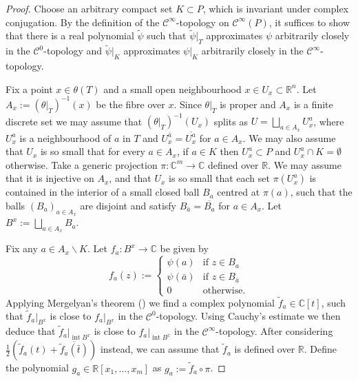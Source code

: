 \documentclass{amsart}
\theoremstyle{plain}
\theoremstyle{definition}
\theoremstyle{remark}
\numberwithin{equation}{thm} %
\newcommand{\R}{\mathbb{R}}
\newcommand{\C}{\mathbb{C}}
\DeclareMathOperator{\Int}{int}
\begin{document}
\begin{proof}
Choose an arbitrary compact set $K\subset P$, which is invariant under complex conjugation. By the definition of the $\mathcal C^\infty$-topology on $\mathcal C^\infty(P)$, it suffices to show that there is a real polynomial $\tilde \psi$ such that $\tilde \psi\vert_T$ approximates $\psi$ arbitrarily closely in the $\mathcal C^0$-topology and $\tilde \psi\vert_K$ approximates $\psi\vert_K$ arbitrarily closely in the $\mathcal C^\infty$-topology.

Fix a point $x\in \theta(T)$ and a small open neighbourhood $x\in U_x\subset \R^n$. Let $A_x:=(\theta\vert_T)^{-1}(x)$ be the fibre over $x$. Since $\theta\vert_T$ is proper and $A_x$ is a finite discrete set we may assume that $(\theta\vert_T)^{-1}(U_x)$ splits as $U=\bigsqcup_{a\in A_x} U_x^a$, where $U_x^a$ is a neighbourhood of $a$ in $T$ and $U_x^{\bar a}=\overline{U_x^a}$ for $a \in A_x$. We may also assume that $U_x$ is so small that for every $a\in A_x$, if $a\in K$ then $U_x^a\subset P$ and $U_x^a\cap K=\emptyset$ otherwise. Take a generic projection $\pi:\C^m\rightarrow \C$ defined over $\R$. We may assume that it is injective on $A_x$, and that $U_x$ is so small that each set $\pi(U_x^a)$ is contained in the interior of a small closed ball $B_a$ centred at $\pi(a)$, such that the balls $(B_a)_{a\in A_x}$ are disjoint and satisfy $B_{\bar a}=\overline{B_a}$ for $a\in A_x$. Let $B^x:=\bigsqcup_{a\in A_x}B_a$.

Fix any $a\in A_x\backslash K$. Let $f_a: B^x\rightarrow \C$ be given by 
\begin{equation*}
    f_a(z):=\begin{cases}
        \psi(a)& \text{if }z\in B_a \\
        \psi(\bar a)& \text{if }z\in B_{\bar a} \\
        0 & \text{otherwise}.
    \end{cases}
\end{equation*}
Applying Mergelyan's theorem (\cite[Theorem 20.5]{rudinRealComplexAnalysis1974}) we find a complex polynomial $\tilde f_a\in \C[t]$, such that $\tilde f_a\vert_{B^x}$ is close to $f_a\vert_{B^x}$ in the $\mathcal C^0$-topology. Using Cauchy's estimate we then deduce that $\tilde f_a\vert_{\Int B^x}$ is close to $f_a\vert_{\Int B^x}$ in the $\mathcal C^\infty$-topology. After considering $\frac{1}{2}\left(\tilde f_a(t)+\overline{\tilde f_a(\bar t)}\right)$ instead, we can assume that $\tilde f_a$ is defined over $\R$. Define the polynomial $g_a\in \R[x_1,\dots,x_m]$ as $g_a:=\tilde f_a\circ \pi$.


\end{proof}
\end{document}

